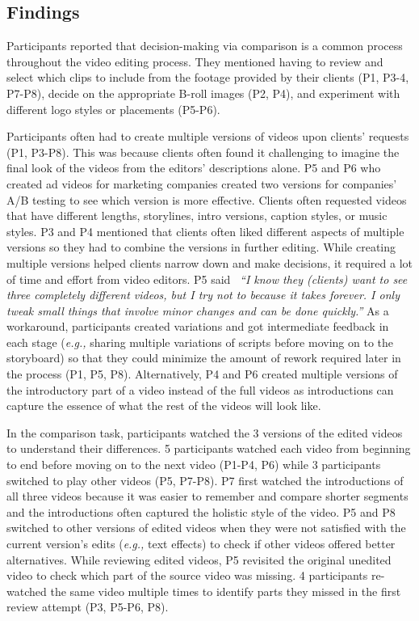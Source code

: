 \subsection{Findings}
Participants reported that decision-making via comparison is a common process throughout the video editing process. They mentioned having to review and select which clips to include from the footage provided by their clients (P1, P3-4, P7-P8), decide on the appropriate B-roll images (P2, P4), and experiment with different logo styles or placements (P5-P6).

Participants often had to create multiple versions of videos upon clients' requests (P1, P3-P8). 
This was because clients often found it challenging to imagine the final look of the videos from the editors' descriptions alone. P5 and P6 who created ad videos for marketing companies created two versions for companies' A/B testing to see which version is more effective. 
Clients often requested videos that have different lengths, storylines, intro versions, caption styles, or music styles. P3 and P4 mentioned that clients often liked different aspects of multiple versions so they had to combine the versions in further editing. 
While creating multiple versions helped clients narrow down and make decisions, it required a lot of time and effort from video editors. P5 said ~\textit{``I know they (clients) want to see three completely different videos, but I try not to because it takes forever. I only tweak small things that involve minor changes and can be done quickly.''}
As a workaround, participants created variations and got intermediate feedback in each stage (\textit{e.g.,} sharing multiple variations of scripts before moving on to the storyboard) so that they could minimize the amount of rework required later in the process (P1, P5, P8). Alternatively, P4 and P6 created multiple versions of the introductory part of a video instead of the full videos as introductions can capture the essence of what the rest of the videos will look like.


In the comparison task, participants watched the 3 versions of the edited videos to understand their differences. 5 participants watched each video from beginning to end before moving on to the next video (P1-P4, P6) while 3 participants switched to play other videos (P5, P7-P8). P7 first watched the introductions of all three videos because it was easier to remember and compare shorter segments and the introductions often captured the holistic style of the video. P5 and P8 switched to other versions of edited videos when they were not satisfied with the current version's edits (\textit{e.g.,} text effects) to check if other videos offered better alternatives. 
While reviewing edited videos, P5 revisited the original unedited video to check which part of the source video was missing. 4 participants re-watched the same video multiple times to identify parts they missed in the first review attempt (P3, P5-P6, P8). 

